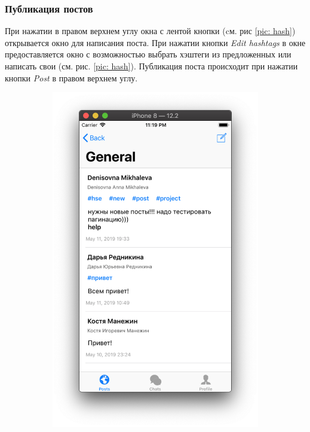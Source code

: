 \documentclass[a4paper,12pt]{article}
\begin{document}
	\subsubsection{Публикация постов}
	При нажатии в правом верхнем углу окна с лентой кнопки (cм. рис \ref{pic: hash}) открывается окно для написания поста. При нажатии кнопки \textit{Edit hashtags} в окне предоставляется окно с возможностью выбрать хэштеги из предложенных или написать свои (см. рис. \ref{pic: hash}). Публикация поста происходит при нажатии кнопки \textit{Post} в правом верхнем углу.
	\begin{figure}[h!]
		\centering
		\begin{subfigure}[b]{0.3\linewidth}
			\includegraphics[width=\linewidth]{../includes/pmi/general.png}

\end{subfigure}
\end{figure}
\end{document}
